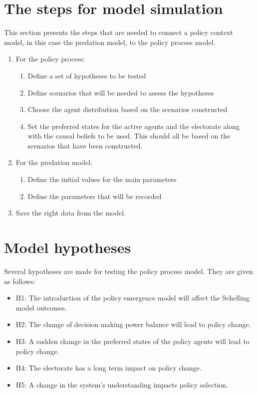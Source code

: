 \documentclass[12pt]{article}
\begin{document}
\section{The steps for model simulation}
\label{sec:steps}

This section presents the steps that are needed to connect a policy context model, in this case the predation model, to the policy process model.

\begin{enumerate}
\item For the policy process:
	\begin{enumerate}
	\item Define a set of hypotheses to be tested
	\item Define scenarios that will be needed to assess the hypotheses
	\item Choose the agent distribution based on the scenarios constructed
	\item Set the preferred states for the active agents and the electorate along with the causal beliefs to be used. This should all be based on the scenarios that have been constructed.
	\end{enumerate}

\item For the predation model:
	\begin{enumerate}
	\item Define the initial values for the main parameters
	\item Define the parameters that will be recorded
	\end{enumerate}
\item Save the right data from the model.
\end{enumerate}

\section{Model hypotheses}
\label{sec:steps}

Several hypotheses are made for testing the policy process model. They are given as follows:

\begin{itemize}
\item H1: The introduction of the policy emergence model will affect the Schelling model outcomes.
\item H2: The change of decision making power balance will lead to policy change.
\item H3: A sudden change in the preferred states of the policy agents will lead to policy change.
\item H4: The electorate has a long term impact on policy change.
\item H5: A change in the system's understanding impacts policy selection.
\end{itemize}
\end{document}
